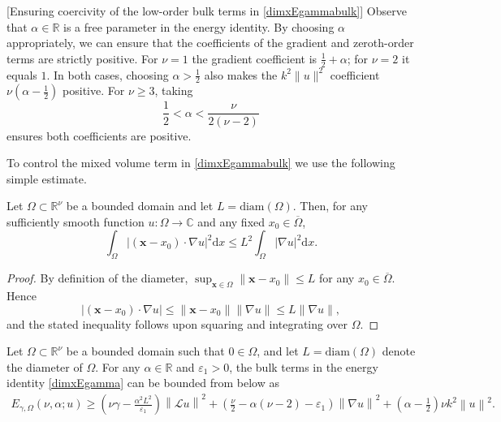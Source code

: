 \documentclass[twoside,11pt]{article}
\def\dimx{\nu }
\def\d{{\mathrm d}}
\def\L{{\mathscr{L}}}
\newcommand{\qp}[1]{\ensuremath{\!\left({#1}\right)}}
\newcommand{\Norm}[1]{\ensuremath{\left\|#1\right\|}}
\renewcommand{\vec}[1]{\boldsymbol{#1}}
\def\L{{\mathscr{L}}}
\begin{document}
{\begin{remark}\label{choice_of_alpha}[Ensuring coercivity of the low-order bulk terms in \eqref{dimxEgammabulk}]
  Observe that $\alpha\in\mathbb{R}$ is a free parameter in the energy identity. By choosing $\alpha$ appropriately, we can ensure that the coefficients of the gradient and zeroth-order terms are strictly positive. {For $\dimx=1$ the gradient coefficient is $\tfrac12+\alpha$; for $\dimx=2$ it equals $1$. In both cases, choosing $\alpha>\tfrac12$ also makes the $k^2\|u\|^2$ coefficient $\dimx(\alpha-\tfrac12)$ positive. For $\dimx\ge 3$, taking}
  \[
    {\frac 12<\alpha<\frac{\dimx}{2(\dimx-2)}}
  \]
  {ensures both coefficients are positive.}
\end{remark}
{To control the mixed volume term in \eqref{dimxEgammabulk} we use the following simple estimate.}

\begin{lemma}
  \label{lem:weightedgrad}
  {Let $\Omega \subset \mathbb{R}^{\dimx}$ be a bounded domain and let $L=\mathrm{diam}(\Omega)$. Then, for any sufficiently smooth function $u\colon\Omega\to\mathbb{C}$ and any fixed $x_0\in\overline{\Omega}$,}
  \begin{equation}
    {\int_\Omega \big|(\vec{x}-x_0)\cdot \nabla u\big|^2   \d x  \le  L^2 \int_\Omega |\nabla u|^2   \d x.}
  \end{equation}
\end{lemma}

\begin{proof}
  {By definition of the diameter, $\sup_{\vec{x}\in\Omega}\|\vec{x}-x_0\|\le L$ for any $x_0\in\overline{\Omega}$. Hence}
  \[
    {|(\vec{x}-x_0)\cdot \nabla u| \le \|\vec{x}-x_0\| \|\nabla u\| \le L \|\nabla u\|,}
  \]
  {and the stated inequality follows upon squaring and integrating over $\Omega$.}
\end{proof}

\begin{proposition}
  Let $\Omega \subset \mathbb{R}^\dimx$ be a bounded domain such that $0 \in \Omega$, and let $L=\mathrm{diam}(\Omega)$ denote the diameter of $\Omega$. For any $\alpha \in \mathbb{R}$ and $\varepsilon_1>0$, the bulk terms in the energy identity \eqref{dimxEgamma} can be bounded from below as
  \begin{multline}
   E_{\gamma,\Omega}(\dimx,\alpha;u) 
    \ge
    \qp{\dimx \gamma - \frac{\alpha^2 L^2}{\varepsilon_1}} \Norm{\L u}^2
    +    
    \qp{\frac{\dimx}{2} - \alpha (\dimx -2) - \varepsilon_1}\Norm{\nabla u}^2
    +
    {\qp{\alpha - \frac{1}{2}} \dimx k^2} \Norm{u}^2.
  \end{multline}
\end{proposition}

}
\end{document}
